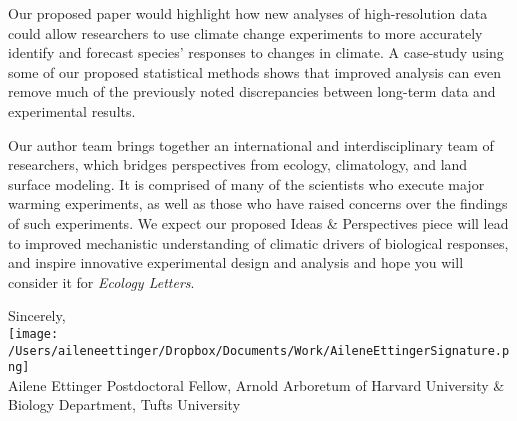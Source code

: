 \documentclass[11pt,a4paper]{letter}
\begin{document}
\begin{letter}{}
Our proposed paper would highlight how new analyses of high-resolution data could allow researchers to use climate change experiments to more accurately identify and forecast species' responses to changes in climate. A case-study using some of our proposed statistical methods shows that improved analysis can even remove much of the previously noted discrepancies between long-term data and experimental results. 

Our author team brings together an international and interdisciplinary team of researchers, which bridges perspectives from ecology, climatology, and land surface modeling. It is comprised of many of the scientists who execute major warming experiments, as well as those who have raised concerns over the findings of such experiments.  We expect our proposed Ideas \& Perspectives piece will lead to improved mechanistic understanding of climatic drivers of biological responses, and inspire innovative experimental design and analysis and hope you will consider it for \emph{Ecology Letters}.

Sincerely,\\

\texttt{[image: /Users/aileneettinger/Dropbox/Documents/Work/AileneEttingerSignature.png]} \\
Ailene Ettinger
Postdoctoral Fellow, Arnold Arboretum of Harvard University \& Biology Department, Tufts University


\end{letter}
\end{document}
